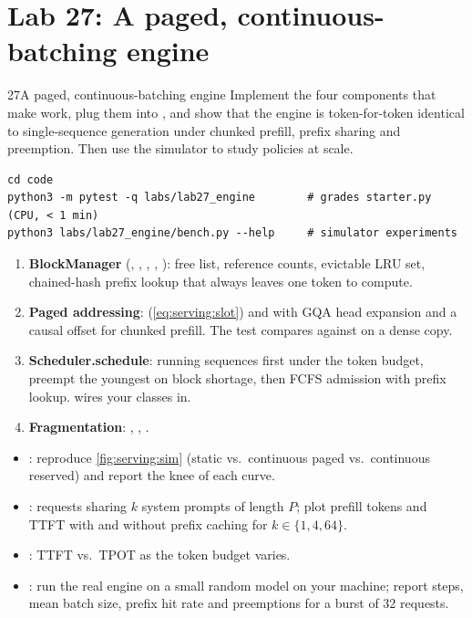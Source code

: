 \section{Lab 27: A paged, continuous-batching engine}\label{sec:serving:lab}
\begin{labbox}{27}{A paged, continuous-batching engine}
Implement the four components that make  work, plug them into ,
and show that the engine is token-for-token identical to single-sequence generation under chunked
prefill, prefix sharing and preemption. Then use the simulator to study policies at scale.

\begin{lstlisting}[style=shell]
cd code
python3 -m pytest -q labs/lab27_engine        # grades starter.py (CPU, < 1 min)
python3 labs/lab27_engine/bench.py --help     # simulator experiments
\end{lstlisting}

\begin{enumerate}
  \item \textbf{BlockManager} (, , , ,
    ): free list, reference counts, evictable LRU set, chained-hash prefix lookup that
    always leaves one token to compute.
  \item \textbf{Paged addressing}:  (\cref{eq:serving:slot}) and
     with GQA head expansion and a causal offset for chunked prefill. The test
    compares against  on a dense copy.
  \item \textbf{Scheduler.schedule}: running sequences first under the token budget, preempt the youngest
    on block shortage, then FCFS admission with prefix lookup.  wires your classes in.
  \item \textbf{Fragmentation}: , , .
\end{enumerate}

\begin{itemize}
  \item {}: reproduce \cref{fig:serving:sim} (static vs.\ continuous paged vs.\
    continuous reserved) and report the knee of each curve.
  \item {}: requests sharing $k$ system prompts of length $P$; plot prefill
    tokens and TTFT with and without prefix caching for $k\in\{1,4,64\}$.
  \item \code{bench.py --exp budget}: TTFT vs.\ TPOT as the token budget varies.
  \item \code{bench.py --exp engine}: run the real engine on a small random model on your machine; report
    steps, mean batch size, prefix hit rate and preemptions for a burst of 32 requests.
\end{itemize}


\end{labbox}
